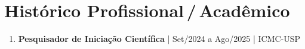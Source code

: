 \section{Histórico Profissional\,/\,Acadêmico}
\begin{enumerate}[label=$\bullet$]
	\item
	\textbf{Pesquisador de Iniciação Científica} | Set/2024 a Ago/2025 | ICMC-USP
\end{enumerate}
